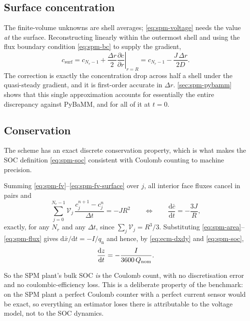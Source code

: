 \subsection{Surface concentration}
The finite-volume unknowns are shell averages; \eqref{eq:spm-voltage} needs the value \emph{at}
the surface. Reconstructing linearly within the outermost shell and using the flux boundary
condition \eqref{eq:spm-bc} to supply the gradient,
\begin{equation}
c_{\mathrm{surf}} = c_{N_r-1} + \frac{\Delta r}{2}
 \left.\frac{\partial c}{\partial r}\right|_{r=R}
 = c_{N_r-1} - \frac{J\,\Delta r}{2D} .
\label{eq:spm-csurf}
\end{equation}
The correction is exactly the concentration drop across half a shell under the quasi-steady
gradient, and it is first-order accurate in $\Delta r$. \cref{sec:spm-pybamm} shows that this
single approximation accounts for essentially the entire discrepancy against PyBaMM, and for all
of it at $t=0$.

\subsection{Conservation}
The scheme has an exact discrete conservation property, which is what makes the SOC definition
\eqref{eq:spm-soc} consistent with Coulomb counting to machine precision.

\begin{proposition}\label{prop:spm-conserve}
Summing \eqref{eq:spm-fv}--\eqref{eq:spm-fv-surface} over $j$, all interior face fluxes cancel in
pairs and
\begin{equation}
\sum_{j=0}^{N_r-1}\mathcal{V}_j\,\frac{c_j^{n+1}-c_j^{n}}{\Delta t} = -J R^2
\qquad\Longleftrightarrow\qquad
\frac{\mathrm{d}\bar{c}}{\mathrm{d}t} = -\frac{3J}{R},
\label{eq:spm-conserve}
\end{equation}
exactly, for any $N_r$ and any $\Delta t$, since $\sum_j\mathcal{V}_j = R^3/3$. Substituting
\eqref{eq:spm-area}--\eqref{eq:spm-flux} gives
$\mathrm{d}\bar{x}/\mathrm{d}t = -I/q_{\mathrm{n}}$ and hence, by \eqref{eq:ecm-dxdy} and
\eqref{eq:spm-soc},
\begin{equation}
\frac{\mathrm{d}z}{\mathrm{d}t} = -\frac{I}{3600\,Q_{\mathrm{nom}}} .
\label{eq:spm-coulomb}
\end{equation}
\end{proposition}

So the SPM plant's bulk SOC \emph{is} the Coulomb count, with no discretisation error and no
coulombic-efficiency loss. This is a deliberate property of the benchmark: on the SPM plant a
perfect Coulomb counter with a perfect current sensor would be exact, so everything an estimator
loses there is attributable to the voltage model, not to the SOC dynamics.


